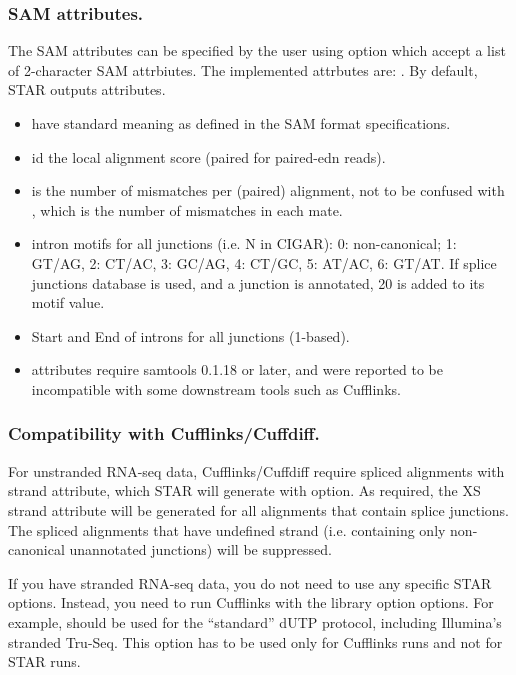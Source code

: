 \documentclass[12pt]{article}
\begin{document}
\subsubsection{SAM attributes.}
The SAM attributes can be specified by the user using   option which accept a list of 2-character SAM attrbiutes. The implemented attrbutes are: . By default, STAR outputs  attributes.
\begin{itemize}
\item[]
 have standard meaning as defined in the SAM format specifications.
\item[]
 id the local alignment score (paired for paired-edn reads). 
\item[]
 is the number of mismatches per (paired) alignment, not to be confused with , which is the number of mismatches in each mate.
\item[]
 intron motifs for all junctions (i.e. N in CIGAR): 0: non-canonical; 1: GT/AG, 2: CT/AC, 3: GC/AG, 4: CT/GC, 5: AT/AC, 6: GT/AT. If splice junctions database is used, and a junction is annotated, 20 is added to its motif value.
\item[]
 Start and End of introns for all junctions (1-based).
\item[]
 attributes require samtools 0.1.18 or later, and were reported to be incompatible with some downstream tools such as Cufflinks.
\end{itemize}

\subsubsection{Compatibility with Cufflinks/Cuffdiff.}
For unstranded RNA-seq data, Cufflinks/Cuffdiff require spliced alignments with  strand attribute, which STAR will generate with   option. As required, the XS strand attribute will be generated for all alignments that contain splice junctions. The spliced alignments that have undefined strand (i.e. containing only non-canonical unannotated junctions) will be suppressed.

If you have stranded RNA-seq data, you do not need to use any specific STAR options. Instead, you need to run Cufflinks with the library option  options. For example,  should be used for the “standard” dUTP protocol, including Illumina's stranded Tru-Seq. This option has to be used only for Cufflinks runs and not for STAR runs.
\end{document}
